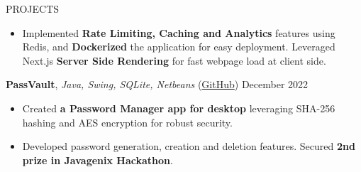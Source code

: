 \documentclass{resume} %
\begin{document}
\begin{rSection}{PROJECTS}
\begin{itemize}
        \item Implemented \textbf{Rate Limiting, Caching and Analytics} features using Redis, and \textbf{Dockerized} the application for easy deployment. Leveraged Next.js \textbf{Server Side Rendering} for fast webpage load at client side.
    \end{itemize}

   
    \item \textbf{PassVault}, \textit{Java, Swing, SQLite, Netbeans} (\href{https://github.com/ninadnaik10/PassVault} {GitHub}) \hfill {December 2022}
    \begin{itemize}
        \setlength\itemsep{-0.6em}
        \item Created \textbf{a Password Manager app for desktop} leveraging SHA-256 hashing
              and AES encryption for robust security.
        \item Developed password generation, creation and deletion features. Secured
              \textbf{2nd prize in Javagenix Hackathon}.
    \end{itemize}

\end{rSection}
\end{document}
